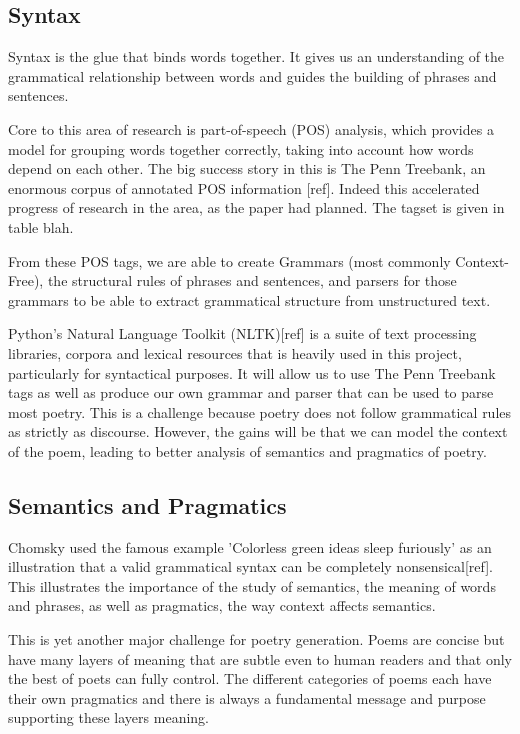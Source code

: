 \subsection{Syntax}
Syntax is the glue that binds words together. It gives us an understanding of the grammatical relationship between words and guides the building of phrases and sentences.

Core to this area of research is part-of-speech (POS) analysis, which provides a model for grouping words together correctly, taking into account how words depend on each other. The big success story in this is The Penn Treebank, an enormous corpus of annotated POS information [ref]. Indeed this accelerated progress of research in the area, as the paper had planned. The tagset is given in table blah.

From these POS tags, we are able to create Grammars (most commonly Context-Free), the structural rules of phrases and sentences, and parsers for those grammars to be able to extract grammatical structure from unstructured text.

Python's Natural Language Toolkit (NLTK)[ref] is a suite of text processing libraries, corpora and lexical resources that is heavily used in this project, particularly for syntactical purposes. It will allow us to use The Penn Treebank tags as well as produce our own grammar and parser that can be used to parse most poetry. This is a challenge because poetry does not follow grammatical rules as strictly as discourse. However, the gains will be that we can model the context of the poem, leading to better analysis of semantics and pragmatics of poetry.

\subsection{Semantics and Pragmatics}
Chomsky used the famous example 'Colorless green ideas sleep furiously' as an illustration that a valid grammatical syntax can be completely nonsensical[ref]. This illustrates the importance of the study of semantics, the meaning of words and phrases, as well as pragmatics, the way context affects semantics.

This is yet another major challenge for poetry generation. Poems are concise but have many layers of meaning that are subtle even to human readers and that only the best of poets can fully control. The different categories of poems each have their own pragmatics and there is always a fundamental message and purpose supporting these layers meaning.

